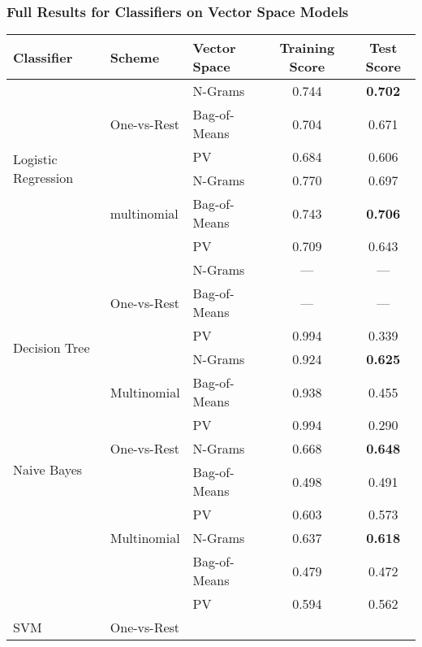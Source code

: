 \subsubsection{Full Results for Classifiers on Vector Space Models}
\label{subs:Full Results for Classifiers on Vector Space Models}


\begin{table}[h]
  \begin{center}
    \begin{tabular}{ lll cc }
      \toprule
      Classifier & Scheme & Vector Space & Training Score & Test Score \\
      \midrule
      \multirow{6}{*}{Logistic Regression}
       & \multirow{3}{*}{One-vs-Rest}
         & N-Grams & 0.744 & \textbf{0.702} \\
       & & Bag-of-Means & 0.704 & 0.671 \\
       & & PV & 0.684 & 0.606 \\
       \cmidrule(r){2-5}
       & \multirow{3}{*}{multinomial}
       & N-Grams & 0.770 & 0.697 \\
       & & Bag-of-Means & 0.743 & \textbf{0.706} \\
       & & PV & 0.709 & 0.643 \\
      \midrule
      \multirow{6}{*}{Decision Tree}
       & \multirow{3}{*}{One-vs-Rest}
         & N-Grams & --- & --- \\
       & & Bag-of-Means & --- & --- \\
       & & PV & 0.994 & 0.339 \\
       \cmidrule(r){2-5}
       & \multirow{3}{*}{Multinomial}
       & N-Grams & 0.924 & \textbf{0.625} \\
       & & Bag-of-Means & 0.938 & 0.455 \\
       & & PV & 0.994 & 0.290 \\
      \midrule
      \multirow{2}{*}{Naive Bayes}
       & \multirow{1}{*}{One-vs-Rest}
         & N-Grams & 0.668 & \textbf{0.648} \\
         & & Bag-of-Means & 0.498 & 0.491 \\
         & & PV & 0.603 & 0.573 \\
       \cmidrule(r){2-5}
       & \multirow{1}{*}{Multinomial}
       & N-Grams & 0.637 & \textbf{0.618} \\
       & & Bag-of-Means & 0.479 & 0.472 \\
       & & PV & 0.594 & 0.562 \\
      \midrule
      \multirow{6}{*}{SVM}
       & \multirow{3}{*}{One-vs-Rest}

\end{tabular}
\end{center}
\end{table}

